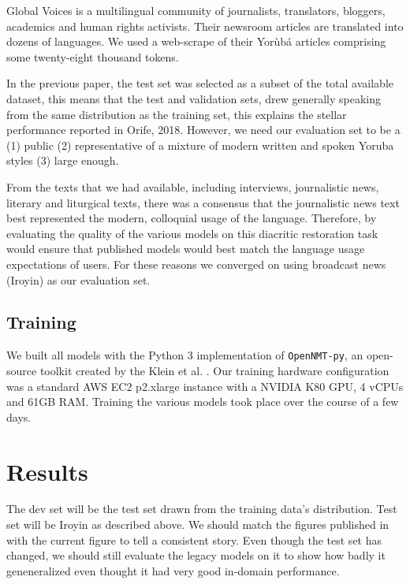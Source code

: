 \documentclass{article} %
\begin{document}
Global Voices is a multilingual community of journalists, translators, bloggers, academics and human rights activists. Their newsroom articles are translated into dozens of languages. We used a web-scrape of their Yor{\`u}b{\'a} articles comprising some twenty-eight thousand tokens.

In the previous paper, the test set was selected as a subset of the total available dataset, this means that the test and validation sets, drew generally speaking from the same distribution as the training set, this explains the stellar performance reported in Orife, 2018. However, we need our evaluation set to be a (1) public (2) representative of a mixture of modern written and spoken Yoruba styles (3) large enough. 

From the texts that we had available, including interviews, journalistic news, literary and liturgical texts, there was a consensus that the journalistic news text best represented the modern, colloquial usage of the language. Therefore, by evaluating the quality of the various models on this diacritic restoration task would ensure that published models would best match the language usage expectations of users. For these reasons we converged on using broadcast news (Iroyin) as our evaluation set.


\subsection{Training}\label{sec:training}
We built all models with the Python 3 implementation of \texttt{OpenNMT-py}, an open-source toolkit created by the Klein et al. \citep{opennmt}. Our training hardware configuration was a standard AWS EC2 p2.xlarge instance with a NVIDIA K80 GPU, 4 vCPUs and 61GB RAM. Training the various models took place over the course of a few days.


\section{Results}\label{sec:results}


The dev set will be the test set drawn from the training data's distribution. Test set will be Iroyin as described above. We should match the figures published in \citep{orife2018adr} with the current figure to tell a consistent story. Even though the test set has changed, we should still evaluate the legacy models on it to show how badly it geneneralized even thought it had very good in-domain performance.
\end{document}
